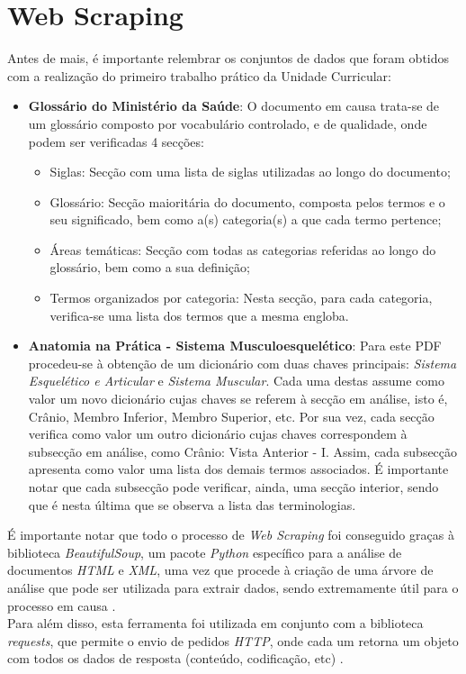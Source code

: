 \section{Web Scraping}

Antes de mais, é importante relembrar os conjuntos de dados que foram obtidos com a realização do primeiro trabalho prático da Unidade Curricular:

\begin{itemize}
    \item \textbf{Glossário do Ministério da Saúde}: O documento em causa trata-se de um glossário composto por vocabulário controlado, e de qualidade, onde podem ser verificadas 4 secções:
    \begin{itemize}
        \item Siglas: Secção com uma lista de siglas utilizadas ao longo do documento;

        \item Glossário: Secção maioritária do documento, composta pelos termos e o seu significado, bem como a(s) categoria(s) a que cada termo pertence;

        \item Áreas temáticas: Secção com todas as categorias referidas ao longo do glossário, bem como a sua definição;

        \item Termos organizados por categoria: Nesta secção, para cada categoria, verifica-se uma lista dos termos que a mesma engloba.
    \end{itemize}
  
    
    \item \textbf{Anatomia na Prática - Sistema Musculoesquelético}: Para este PDF procedeu-se à obtenção de um dicionário com duas chaves principais: \textit{Sistema Esquelético e Articular} e \textit{Sistema Muscular}. Cada uma destas assume como valor um novo dicionário cujas chaves se referem à secção em análise, isto é, Crânio, Membro Inferior, Membro Superior, etc. Por sua vez, cada secção verifica como valor um outro dicionário cujas chaves correspondem à subsecção em análise, como Crânio: Vista Anterior - I. Assim, cada subsecção apresenta como valor uma lista dos demais termos associados.
    É importante notar que cada subsecção pode verificar, ainda, uma secção interior, sendo que é nesta última que se observa a lista das terminologias.
    
\end{itemize}

É importante notar que todo o processo de \textit{Web Scraping} foi conseguido graças à biblioteca \textit{BeautifulSoup}, um pacote \textit{Python} específico para a análise de documentos \textit{HTML} e \textit{XML}, uma vez que procede à criação de uma árvore de análise que pode ser utilizada para extrair dados, sendo extremamente útil para o processo em causa \cite{BSoup2024}. \\
Para além disso, esta ferramenta foi utilizada em conjunto com a biblioteca \textit{requests}, que permite o envio de pedidos \textit{HTTP}, onde cada um retorna um objeto com todos os dados de resposta (conteúdo, codificação, etc) \cite{Requests2024}.

